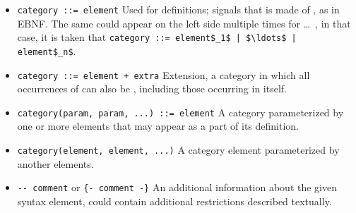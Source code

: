 \begin{itemize}
  \item \lstinline!category ::= element! \newline
    Used for definitions; signals that  is made of , as in EBNF. The same  could appear on the left side multiple times for  \ldots\ , in that case, it is taken that \lstinline!category ::= element$_1$ | $\ldots$ | element$_n$!.
  \item \lstinline!category ::= element + extra! \newline
    Extension, a category in which all occurrences of  can also be , including those occurring in  itself. 
  \item \lstinline!category(param, param, ...) ::= element! \newline
    A category parameterized by one or more elements that may appear as a part of its definition.
  \item \lstinline!category(element, element, ...)! \newline
    A category element parameterized by another elements.
  \item \lstinline!-- comment! or \lstinline!{- comment -}! \newline
    An additional information about the given syntax element, could contain additional restrictions described textually. 
\end{itemize}







